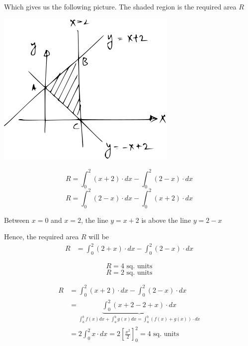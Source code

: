 \documentclass[14pt,fleqn]{extarticle}
\begin{document}
\begin{problem}
\begin{step}
Which gives us the following picture. The shaded region is the required area $R$ 
\begin{center}
\includegraphics[scale=1.4]{figure.svg}
\end{center}
       
\end{step}

\begin{step}
  \begin{options} 
     \correct 
       
       \[ R = \int_0^2 \left(x+2 \right)\cdot dx - \int_0^2 \left(2-x \right)\cdot dx \]
     \incorrect
\[ R = \int_0^2 \left(2-x \right)\cdot dx - \int_0^2 \left(x+2 \right)\cdot dx \]
        
    \end{options} 
     \reason 
     
     Between $x=0$ and $x=2$, the line $y = x+2$ is above the line $y = 2-x$\newline 
     
     Hence, the required area $R$ will be
     \begin{align}
	R &= \int_0^2 \left(2+x \right)\cdot dx - \int_0^2 \left(2-x \right)\cdot dx 
\end{align}
       
\end{step}

\begin{step}
  \begin{options} 
     \correct 
       \[ R = 4\text{ sq. units} \]
     \incorrect
        \[ R = 2\text{ sq. units} \]
    \end{options} 
     \reason 
     
     \begin{align}
	R &= \int_0^2 \left(x+2 \right)\cdot dx - \int_0^2 \left(2-x \right)\cdot dx\\
	&= \underbrace{\int_0^2 \left(x+2 - 2 + x \right)\cdot dx }_{\int_a^b f(x) dx + \int_a^b g(x)dx = \int_a^b \left(f(x) + g(x) \right)\cdot dx} \\
	&= 2 \int_0^2 x\cdot dx = 2 \left[\frac{x^2}{2} \right]_0^2 = 4\text{ sq. units}
\end{align}
       
\end{step}
\end{problem} 
\end{document}

